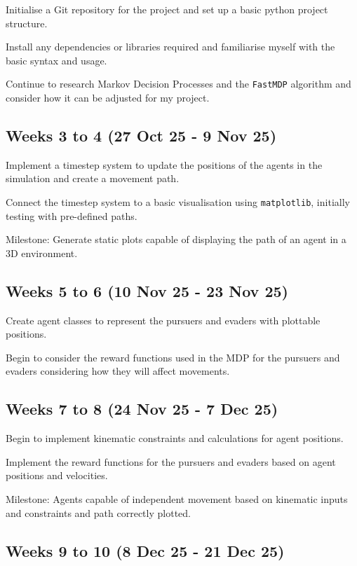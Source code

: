 \documentclass[12pt,a4paper,twoside]{article}
\begin{document}
Initialise a Git repository for the project and set up a basic python project structure.

Install any dependencies or libraries required and familiarise myself with the basic syntax and usage.

Continue to research Markov Decision Processes and the \texttt{FastMDP} algorithm and consider how it can be adjusted for my project.

\subsection*{Weeks 3 to 4 (27 Oct 25 - 9 Nov 25)}

Implement a timestep system to update the positions of the agents in the simulation and create a movement path.

Connect the timestep system to a basic visualisation using \texttt{matplotlib}, initially testing with pre-defined paths.

Milestone: Generate static plots capable of displaying the path of an agent in a 3D environment.

\subsection*{Weeks 5 to 6 (10 Nov 25 - 23 Nov 25)}

Create agent classes to represent the pursuers and evaders with plottable positions.

Begin to consider the reward functions used in the MDP for the pursuers and evaders considering how they will affect movements.

\subsection*{Weeks 7 to 8 (24 Nov 25 - 7 Dec 25)}

Begin to implement kinematic constraints and calculations for agent positions.

Implement the reward functions for the pursuers and evaders based on agent positions and velocities.

Milestone: Agents capable of independent movement based on kinematic inputs and constraints and path correctly plotted.

\subsection*{Weeks 9 to 10 (8 Dec 25 - 21 Dec 25)}
\end{document}
